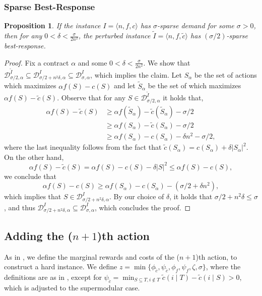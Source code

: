 \documentclass[11pt]{article}
\newtheorem{proposition}{Proposition}
\newcommand{\instanceI}{I=\langle n, f, c \rangle}
\newcommand{\inst}[3]{\langle #1, #2, #3 \rangle}
\newcommand{\demand}[2]{\mathcal{D}_{{#1},{#2}}}
\newcommand{\BR}[3]{\demand{#1}{#2}^{#3}}
\newcommand{\BRI}[2]{\BR{#1}{#2}{I}}
\newcommand{\tc}{\tilde{c}}
\newcommand{\tI}{\tilde{I}}
\newcommand{\InstTildeI}{\tI = \inst{n}{f}{\tc}}
\begin{document}
\subsubsection{Sparse Best-Response}
\begin{proposition}\label{prop:sparse_demand_submod_f_sup_c}
    If the instance $\instanceI$ has $\sigma$-sparse demand for some $\sigma > 0$, then for any $0 < \delta < \frac{\sigma}{2n^2}$, the perturbed instance $\InstTildeI$ has $(\sigma/2)$-sparse best-response.
\end{proposition}
\begin{proof}
\newcommand{\sa}{S_\alpha}
\newcommand{\tsa}{\tilde{S}_\alpha}
    
    Fix a contract $\alpha$ and some $0 < \delta < \frac{\sigma}{2n^2}$. We show that 
    $\BR{\sigma/2}{\alpha}{\tI} \subseteq \BRI{\sigma/2+n^2\delta}{\alpha} \subseteq \BRI{\sigma}{\alpha}$, which implies the claim.
    Let $\sa$ be the set of actions which maximizes $\alpha f(S) - c(S)$ and let $\tsa$ be the set of which maximizes $\alpha f(S) - \tc(S)$.
    Observe that for any $S \in \BR{\sigma/2}{\alpha}{\tI}$
    it holds that,
    \begin{align*}
        \alpha f(S) - \tc(S) 
        &\ge \alpha f(\tsa) - \tc(\tsa) - \sigma/2 \\
        &\ge \alpha f(\sa) - \tc(\sa) - \sigma/2 \\
        &\ge \alpha f(\sa) - c(\sa) -\delta n^2 - \sigma/2,
    \end{align*}
    where the last inequality follows from the fact that $\tc(\sa) = c(\sa) + \delta|\sa|^2$.
    On the other hand, 
    $$\alpha f(S) - \tc(S) = \alpha f(S) - c(S) - \delta|S|^2 \le \alpha f(S) - c(S),$$ 
    we conclude that 
    \[
    \alpha f(S) - c(S) \ge \alpha f(\sa) - c(\sa) - (\sigma/2 + \delta n^2),
    \]
    which implies that $S \in \BRI{\sigma/2+n^2\delta}{\alpha}$.
    By our choice of $\delta$, it holds that $\sigma/2+n^2\delta \le \sigma$, and thus $\BRI{\sigma/2+n^2\delta}{\alpha} \subseteq \BRI{\sigma}{\alpha}$, which concludes the proof.
\end{proof}

\subsection{Adding the ($n+1$)th action}

As in , we 
define the marginal rewards and costs of the ($n+1$)th action, to construct a hard instance.
We define $z = \min \{\phi_{\tc},\psi_{\tc},\phi_f,\psi_f, \zeta, \sigma \}$, where the definitions are as in , except for 
$\psi_{\tc} = \min_{S\subseteq T, i \notin T} \tc(i \mid T)-\tc(i \mid S) > 0$, which is adjusted to the supermodular case.
\end{document}
